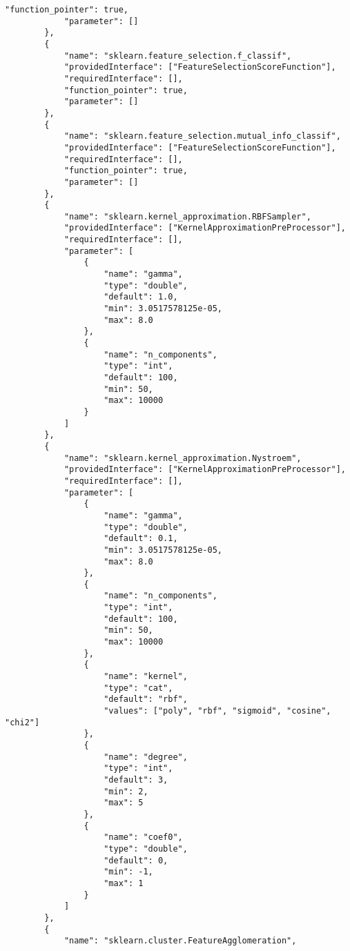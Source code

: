 \begin{Verbatim}[fontsize=\scriptsize]
            "function_pointer": true,
            "parameter": []
        },
        {
            "name": "sklearn.feature_selection.f_classif",
            "providedInterface": ["FeatureSelectionScoreFunction"],
            "requiredInterface": [],
            "function_pointer": true,
            "parameter": []
        },
        {
            "name": "sklearn.feature_selection.mutual_info_classif",
            "providedInterface": ["FeatureSelectionScoreFunction"],
            "requiredInterface": [],
            "function_pointer": true,
            "parameter": []
        },
        {
            "name": "sklearn.kernel_approximation.RBFSampler",
            "providedInterface": ["KernelApproximationPreProcessor"],
            "requiredInterface": [],
            "parameter": [
                {
                    "name": "gamma",
                    "type": "double",
                    "default": 1.0,
                    "min": 3.0517578125e-05,
                    "max": 8.0
                },
                {
                    "name": "n_components",
                    "type": "int",
                    "default": 100,
                    "min": 50,
                    "max": 10000
                }
            ]
        },
        {
            "name": "sklearn.kernel_approximation.Nystroem",
            "providedInterface": ["KernelApproximationPreProcessor"],
            "requiredInterface": [],
            "parameter": [
                {
                    "name": "gamma",
                    "type": "double",
                    "default": 0.1,
                    "min": 3.0517578125e-05,
                    "max": 8.0
                },
                {
                    "name": "n_components",
                    "type": "int",
                    "default": 100,
                    "min": 50,
                    "max": 10000
                },
                {
                    "name": "kernel",
                    "type": "cat",
                    "default": "rbf",
                    "values": ["poly", "rbf", "sigmoid", "cosine", "chi2"]
                },
                {
                    "name": "degree",
                    "type": "int",
                    "default": 3,
                    "min": 2,
                    "max": 5
                },
                {
                    "name": "coef0",
                    "type": "double",
                    "default": 0,
                    "min": -1,
                    "max": 1
                }
            ]
        },
        {
            "name": "sklearn.cluster.FeatureAgglomeration",

\end{Verbatim}

